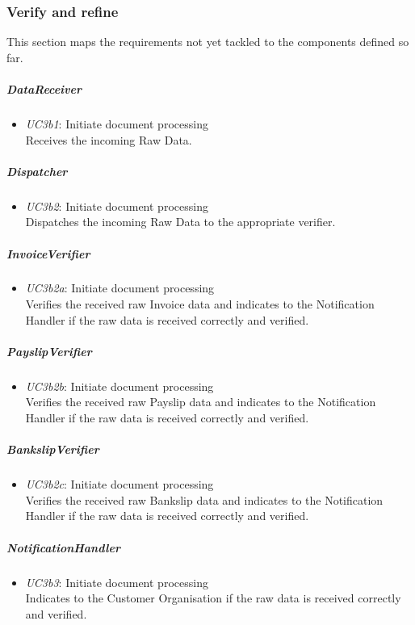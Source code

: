 \documentclass[a4paper,10pt]{article}
\begin{document}
\subsubsection{Verify and refine}
This section maps the requirements not yet tackled to the components defined so far.

\subparagraph{DataReceiver}
\begin{itemize}
	\item \emph{UC3b1}: Initiate document processing\\ Receives the incoming Raw Data.
\end{itemize}

\subparagraph{Dispatcher}
\begin{itemize}
	\item \emph{UC3b2}: Initiate document processing\\ Dispatches the incoming Raw Data to the appropriate verifier.
\end{itemize}

\subparagraph{InvoiceVerifier}
\begin{itemize}
	\item \emph{UC3b2a}: Initiate document processing\\ Verifies the received raw Invoice data and indicates to the Notification Handler if the raw data is received correctly and verified.
\end{itemize}

\subparagraph{PayslipVerifier}
\begin{itemize}
	\item \emph{UC3b2b}: Initiate document processing\\ Verifies the received raw Payslip data and indicates to the Notification Handler if the raw data is received correctly and verified.
\end{itemize}

\subparagraph{BankslipVerifier}
\begin{itemize}
	\item \emph{UC3b2c}: Initiate document processing\\ Verifies the received raw Bankslip data and indicates to the Notification Handler if the raw data is received correctly and verified.
\end{itemize}

\subparagraph{NotificationHandler}
\begin{itemize}
	\item \emph{UC3b3}: Initiate document processing\\ Indicates to the Customer Organisation if the raw data is received correctly and verified.
\end{itemize}
\end{document}
